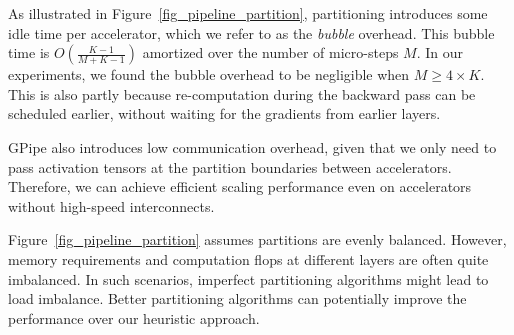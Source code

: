 \documentclass{article}
\def\codename{GPipe}
\begin{document}
As illustrated in Figure~\ref{fig_pipeline_partition}, partitioning introduces some idle time per accelerator, which we refer to as the {\it bubble} overhead. This bubble time is $O(\frac{K-1}{M+K-1})$ amortized over the number of micro-steps $M$. In our experiments, we found the bubble overhead to be negligible when $M \ge 4 \times K$. This is also partly because re-computation during the backward pass can be scheduled earlier, without waiting for the gradients from earlier layers.

\codename{} also introduces low communication overhead, given that we only need to pass activation tensors at the partition boundaries between accelerators. Therefore, we can achieve efficient scaling performance even on accelerators without high-speed interconnects. 

Figure~\ref{fig_pipeline_partition} assumes partitions are evenly balanced. However, memory requirements and computation flops at different layers are often quite imbalanced. In such scenarios, imperfect partitioning algorithms might lead to load imbalance. Better partitioning algorithms can potentially improve the performance over our heuristic approach.
\end{document}
